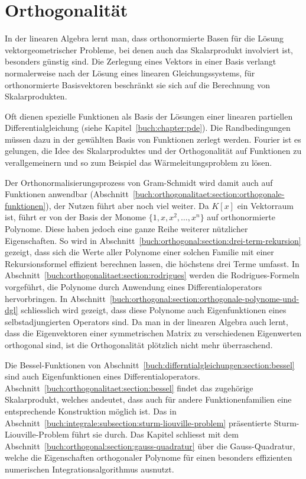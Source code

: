 %
%
%
\chapter{Orthogonalität
\label{buch:chapter:orthogonalitaet}}
\rhead{}
In der linearen Algebra lernt man, dass orthonormierte Basen für die
Lösung vektorgeometrischer Probleme, bei denen auch das Skalarprodukt
involviert ist, besonders günstig sind.
Die Zerlegung eines Vektors in einer Basis verlangt normalerweise nach
der Lösung eines linearen Gleichungssystems, für orthonormierte
Basisvektoren beschränkt sie sich auf die Berechnung von Skalarprodukten.

Oft dienen spezielle Funktionen als Basis der Lösungen einer linearen
partiellen Differentialgleichung (siehe Kapitel~\ref{buch:chapter:pde}).
Die Randbedingungen müssen dazu in der gewählten Basis von Funktionen
zerlegt werden.
Fourier ist es gelungen, die Idee des Skalarproduktes und der Orthogonalität
auf Funktionen zu verallgemeinern und so zum Beispiel das Wärmeleitungsproblem
zu lösen.

Der Orthonormalisierungsprozess von Gram-Schmidt wird damit auch auf
Funktionen anwendbar
(Abschnitt~\ref{buch:orthogonalitaet:section:orthogonale-funktionen}),
der Nutzen führt aber noch viel weiter.
Da $K[x]$ ein Vektorraum ist, führt er von der Basis der Monome
$\{1,x,x^2,\dots,x^n\}$ 
auf orthonormierte Polynome.
Diese haben jedoch eine ganze Reihe weiterer nützlicher Eigenschaften.
So wird in Abschnitt~\ref{buch:orthogonal:section:drei-term-rekursion}
gezeigt, dass sich die Werte aller Polynome einer solchen Familie mit
einer Rekursionsformel effizient berechnen lassen, die höchstens drei
Terme umfasst.
In Abschnitt~\ref{buch:orthogonalitaet:section:rodrigues} werden
die Rodrigues-Formeln vorgeführt, die Polynome durch Anwendung eines
Differentialoperators hervorbringen.
In Abschnitt~\ref{buch:orthogonal:section:orthogonale-polynome-und-dgl}
schliesslich wird gezeigt, dass diese Polynome auch Eigenfunktionen
eines selbstadjungierten Operators sind.
Da man in der linearen Algebra auch lernt, dass die Eigenvektoren einer
symmetrischen Matrix zu verschiedenen Eigenwerten orthogonal sind,
ist die Orthogonalität plötzlich nicht mehr überraschend.

Die Bessel-Funktionen von
Abschnitt~\ref{buch:differntialgleichungen:section:bessel}
sind auch Eigenfunktionen eines Differentialoperators.
Abschnitt~\ref{buch:orthogonalitaet:section:bessel} findet das zugehörige
Skalarprodukt, welches andeutet, dass auch für andere Funktionenfamilien
eine entsprechende Konstruktion möglich ist.
Das in Abschnitt~\ref{buch:integrale:subsection:sturm-liouville-problem}
präsentierte Sturm-Liouville-Problem führt sie durch.
Das Kapitel schliesst mit dem
Abschnitt~\ref{buch:orthogonal:section:gauss-quadratur}
über die Gauss-Quadratur, welche die Eigenschaften orthogonaler Polynome
für einen besonders effizienten numerischen Integrationsalgorithmus
ausnutzt.


